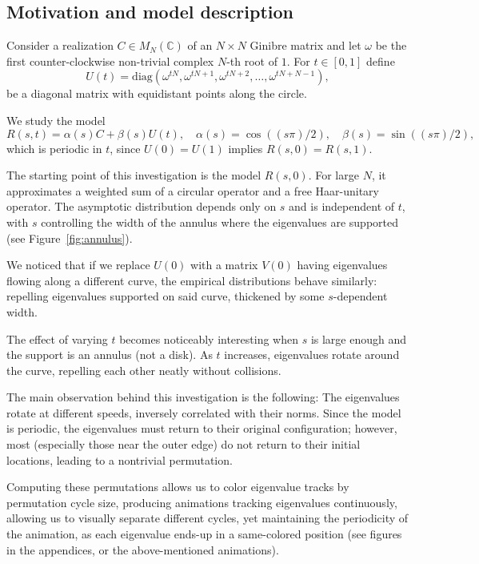 \documentclass{article}
\begin{document}
	\subsection{Motivation and model description}

	Consider a realization $C \in M_N(\mathbb{C})$ of an $N\times N$ Ginibre matrix and 
	let $\omega$ be the first counter-clockwise non-trivial complex $N$-th root of $1$. 
	For $t\in [0,1]$ define
	$$U(t) = \mathrm{diag}(\omega^{tN}, \omega^{tN+1}, \omega^{tN+2}, \dots   , \omega^{tN+N-1}),$$ 
	be a diagonal matrix with equidistant points along the circle.

	We study the model	
	$$R(s,t) = \alpha(s)C + \beta(s)U(t),\quad  \alpha(s)= \cos((s\pi)/2),\quad \beta(s)= \sin((s\pi) /2),$$ 
	which is periodic in $t$, since $U(0) = U(1)$ implies $R(s,0) = R(s,1)$.

	The starting point of this investigation is the model $R(s,0)$. 
	For large $N$, it approximates a weighted sum of a circular operator and a free Haar-unitary operator.  
	The asymptotic distribution depends only on $s$ and is independent of $t$,  
	with $s$ controlling the width of the annulus where the eigenvalues are supported 
	(see Figure~\ref{fig:annulus}).

	We noticed that if we replace $U(0)$ 
	with a matrix $V(0)$ having eigenvalues flowing along a different curve,  
	the empirical distributions behave similarly:  
	repelling eigenvalues supported on said curve, 
	thickened by some  $s$-dependent width.
	
	The effect of varying $t$ becomes noticeably interesting 
	when $s$ is large enough and the support is an annulus (not a disk).  
	As $t$ increases, eigenvalues rotate around the curve, 
	repelling each other neatly without collisions.
	
	The main observation behind this investigation is the following:  
	The eigenvalues rotate at different speeds, inversely correlated with their norms.  
	Since the model is periodic, the eigenvalues must return to their original configuration;  
	however, most (especially those near the outer edge) do not return to their initial locations,  
	leading to a nontrivial permutation.

	Computing these permutations allows us to color eigenvalue tracks by permutation cycle size,  
	producing animations tracking eigenvalues continuously, 
	allowing us to visually separate different cycles, yet maintaining the periodicity of the animation,  
	as each eigenvalue ends-up in a same-colored position 
	(see figures in the appendices, or the above-mentioned animations).  
\end{document}
